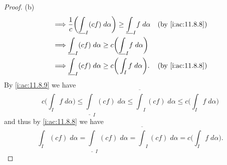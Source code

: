\begin{proof}{(b)}
\begin{align*}
    \implies & \dfrac{1}{c} \bigg(\underline{\int}_I (cf) \; d \alpha\bigg) \geq \underline{\int}_I f \; d \alpha &  & \by{i:ac:11.8.8}                         \\
    \implies & \underline{\int}_I (cf) \; d \alpha \geq c\bigg(\underline{\int}_I f \; d \alpha\bigg)                                                           \\
    \implies & \underline{\int}_I (cf) \; d \alpha \geq c\bigg(\int_I f \; d \alpha\bigg).                        &  & \by{i:ac:11.8.8}
  \end{align*}
  By \cref{i:ac:11.8.9} we have
  \[
    c\bigg(\int_I f \; d \alpha\bigg) \leq \underline{\int}_I (cf) \; d \alpha \leq \overline{\int}_I (cf) \; d \alpha \leq c\bigg(\int_I f \; d \alpha\bigg)
  \]
  and thus by \cref{i:ac:11.8.8} we have
  \[
    \int_I (cf) \; d \alpha = \underline{\int}_I (cf) \; d \alpha = \overline{\int}_I (cf) \; d \alpha = c\bigg(\int_I f \; d \alpha\bigg).
  \]


\end{proof}
